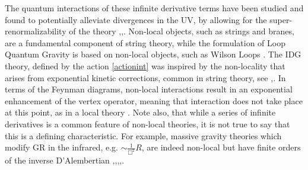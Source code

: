 The quantum interactions of these infinite derivative terms have been studied and found to potentially alleviate divergences in the UV, by allowing for the super-renormalizability of the theory \cite{Tomboulis:1997gg},\cite{Moffat:2010bh},\cite{Talaganis:2014ida}. Non-local objects, such as strings and branes, are a fundamental  component of string theory, while the formulation of Loop Quantum Gravity is based on non-local objects, such as Wilson Loops \cite{Talaganis:2015wva}. The IDG theory, defined by the action \eqref{actionint} was inspired by the non-locality that arises from  exponential kinetic corrections, common in string theory, see \cite{Biswas:2005qr},\cite{zwiebach2004first}. In terms of the Feynman diagrams, non-local interactions result in an exponential enhancement of the vertex operator, meaning that interaction does not take place at this point, as in a local theory \cite{Talaganis:2014ida, Stelle:1976gc, Goroff:1985th}. 
Note also, that while a series of infinite derivatives is a common feature of non-local theories, it is not true to say that this is a defining characteristic. For example, massive gravity theories which modify GR in the infrared, e.g. $\sim \frac{1}{\Box^2} R$, are indeed non-local but have finite orders of the inverse D'Alembertian \cite{Maggiore:2013mea},\cite{Maggiore:2014sia},\cite{Conroy:2014eja},\cite{Jaccard:2013gla},\cite{Modesto:2013jea}.

